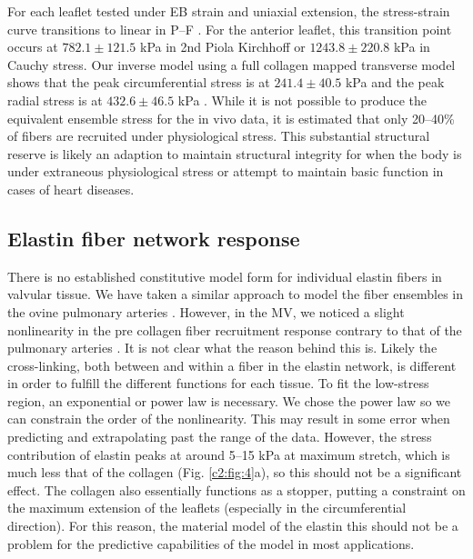     For each leaflet tested under EB strain and uniaxial extension, the stress-strain curve transitions to linear in P–F \cite{sasaki_elongation_1996,sasaki_stress_1996,liao_relation_2007}. For the anterior leaflet, this transition point occurs at $782.1\pm121.5$ kPa in 2nd Piola Kirchhoff or $1243.8\pm220.8$ kPa in Cauchy stress. Our inverse model using a full collagen mapped transverse model shows that the peak circumferential stress is at $241.4\pm40.5$ kPa and the peak radial stress is at $432.6\pm46.5$ kPa \cite{lee_inverse_2014}. While it is not possible to produce the equivalent ensemble stress for the in vivo data, it is estimated that only 20–40\% of fibers are recruited under physiological stress. This substantial structural reserve is likely an adaption to maintain structural integrity for when the body is under extraneous physiological stress or attempt to maintain basic function in cases of heart diseases.
    



\subsection{Elastin fiber network response}

    There is no established constitutive model form for individual elastin fibers in valvular tissue. We have taken a similar approach to model the fiber ensembles in the ovine pulmonary arteries \cite{fata_insights_2014}. However, in the MV, we noticed a slight nonlinearity in the pre collagen fiber recruitment response contrary to that of the pulmonary arteries \cite{fata_insights_2014}. It is not clear what the reason behind this is. Likely the cross-linking, both between and within a fiber in the elastin network, is different in order to fulfill the different functions for each tissue. To fit the low-stress region, an exponential or power law is necessary. We chose the power law so we can constrain the order of the nonlinearity. This may result in some error when predicting and extrapolating past the range of the data. However, the stress contribution of elastin peaks at around 5–15 kPa at maximum stretch, which is much less that of the collagen (Fig. \ref{c2:fig:4}a), so this should not be a significant effect. The collagen also essentially functions as a stopper, putting a constraint on the maximum extension of the leaflets (especially in the circumferential direction). For this reason, the material model of the elastin this should not be a problem for the predictive capabilities of the model in most applications.


